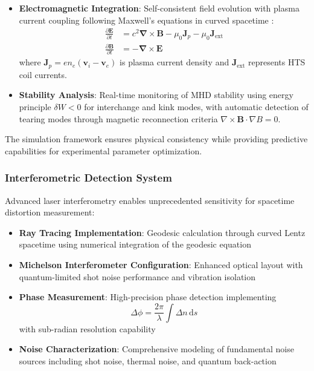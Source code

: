 \documentclass[12pt,a4paper]{article}
\newcommand{\ddt}[1]{\frac{\partial #1}{\partial t}}
\newcommand{\curl}{\boldsymbol{\nabla} \times}
\newcommand{\dd}[1]{\,\mathrm{d}#1}
\begin{document}
\begin{itemize}
\item \textbf{Electromagnetic Integration}: Self-consistent field evolution with plasma current coupling following Maxwell's equations in curved spacetime \cite{Weyl1918}:
\begin{align}
\ddt{\mathbf{E}} &= c^2 \curl \mathbf{B} - \mu_0 \mathbf{J}_p - \mu_0 \mathbf{J}_{\text{ext}} \\
\ddt{\mathbf{B}} &= -\curl \mathbf{E}
\end{align}
where $\mathbf{J}_p = en_e(\mathbf{v}_i - \mathbf{v}_e)$ is plasma current density and $\mathbf{J}_{\text{ext}}$ represents HTS coil currents.

\item \textbf{Stability Analysis}: Real-time monitoring of MHD stability using energy principle $\delta W < 0$ for interchange and kink modes, with automatic detection of tearing modes through magnetic reconnection criteria $\nabla \times \mathbf{B} \cdot \nabla B = 0$.
\end{itemize}

The simulation framework ensures physical consistency while providing predictive capabilities for experimental parameter optimization.

\subsubsection{Interferometric Detection System}

Advanced laser interferometry enables unprecedented sensitivity for spacetime distortion measurement:

\begin{itemize}
\item \textbf{Ray Tracing Implementation}: Geodesic calculation through curved Lentz spacetime using numerical integration of the geodesic equation
\item \textbf{Michelson Interferometer Configuration}: Enhanced optical layout with quantum-limited shot noise performance and vibration isolation
\item \textbf{Phase Measurement}: High-precision phase detection implementing 
\begin{equation}
\Delta\phi = \frac{2\pi}{\lambda} \int \Delta n \dd{s}
\end{equation}
with sub-radian resolution capability
\item \textbf{Noise Characterization}: Comprehensive modeling of fundamental noise sources including shot noise, thermal noise, and quantum back-action
\end{itemize}
\end{document}
